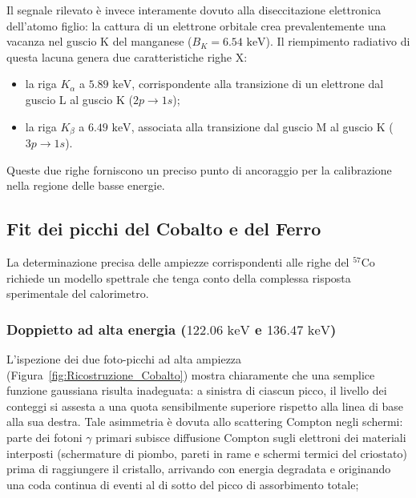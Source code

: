Il segnale rilevato è invece interamente dovuto alla diseccitazione elettronica dell'atomo figlio: la cattura di un elettrone orbitale crea prevalentemente una vacanza nel guscio K del manganese ($B_K = 6.54\text{ keV}$). Il riempimento radiativo di questa lacuna genera due caratteristiche righe X:
\begin{itemize}
    \item la riga $K_\alpha$ a $5.89\text{ keV}$, corrispondente alla transizione di un elettrone dal guscio L al guscio K ($2p \to 1s$);
    \item la riga $K_\beta$ a $6.49\text{ keV}$, associata alla transizione dal guscio M al guscio K ($3p \to 1s$).
\end{itemize}
Queste due righe forniscono un preciso punto di ancoraggio per la calibrazione nella regione delle basse energie.

\subsection{Fit dei picchi del Cobalto e del Ferro}
\label{subsec:fit_picchi_cobalto}

La determinazione precisa delle ampiezze corrispondenti alle righe del $^{57}\text{Co}$ richiede un modello spettrale che tenga conto della complessa risposta sperimentale del calorimetro. 

\subsubsection*{Doppietto ad alta energia ($122.06\text{ keV}$ e $136.47\text{ keV}$)}
L'ispezione dei due foto-picchi ad alta ampiezza (Figura~\ref{fig:Ricostruzione_Cobalto}) mostra chiaramente che una semplice funzione gaussiana risulta inadeguata: a sinistra di ciascun picco, il livello dei conteggi si assesta a una quota sensibilmente superiore rispetto alla linea di base alla sua destra. Tale asimmetria è dovuta allo scattering Compton negli schermi: parte dei fotoni $\gamma$ primari subisce diffusione Compton sugli elettroni dei materiali interposti (schermature di piombo, pareti in rame e schermi termici del criostato) prima di raggiungere il cristallo, arrivando con energia degradata e originando una coda continua di eventi al di sotto del picco di assorbimento totale;

